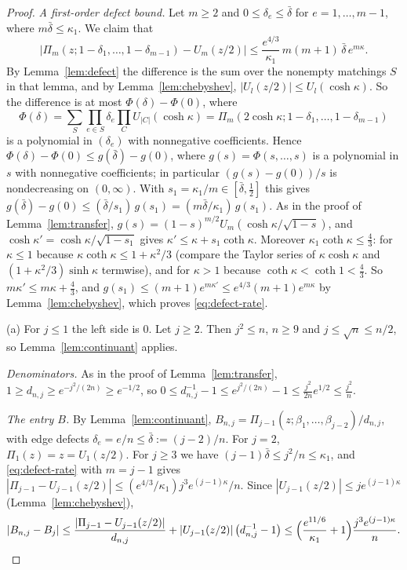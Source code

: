 \documentclass[11pt]{amsart}
\theoremstyle{definition}
\theoremstyle{remark}
\numberwithin{equation}{section}
\begin{document}
\begin{proof}
\emph{A first-order defect bound.} Let $m\ge2$ and $0\le\delta_e\le\bar\delta$ for $e=1,\dots,m-1$, where $m\bar\delta\le\kappa_1$. We claim that
\begin{equation}\label{eq:defect-rate}
\bigl|\Pi_m(z;1-\delta_1,\dots,1-\delta_{m-1})-U_m(z/2)\bigr|\le\frac{e^{4/3}}{\kappa_1}\,m(m+1)\,\bar\delta\,e^{m\kappa}.
\end{equation}
By Lemma~\ref{lem:defect} the difference is the sum over the nonempty matchings $S$ in that lemma, and by Lemma~\ref{lem:chebyshev}, $|U_l(z/2)|\le U_l(\cosh\kappa)$. So the difference is at most $\Phi(\delta)-\Phi(0)$, where
\[
\Phi(\delta)=\sum_S\prod_{e\in S}\delta_e\prod_CU_{|C|}(\cosh\kappa)=\Pi_m(2\cosh\kappa;1-\delta_1,\dots,1-\delta_{m-1})
\]
is a polynomial in $(\delta_e)$ with nonnegative coefficients. Hence $\Phi(\delta)-\Phi(0)\le g(\bar\delta)-g(0)$, where $g(s)=\Phi(s,\dots,s)$ is a polynomial in $s$ with nonnegative coefficients; in particular $(g(s)-g(0))/s$ is nondecreasing on $(0,\infty)$. With $s_1=\kappa_1/m\in[\bar\delta,\frac12]$ this gives $g(\bar\delta)-g(0)\le(\bar\delta/s_1)\,g(s_1)=(m\bar\delta/\kappa_1)\,g(s_1)$. As in the proof of Lemma~\ref{lem:transfer}, $g(s)=(1-s)^{m/2}U_m(\cosh\kappa/\sqrt{1-s})$, and $\cosh\kappa'=\cosh\kappa/\sqrt{1-s_1}$ gives $\kappa'\le\kappa+s_1\coth\kappa$. Moreover $\kappa_1\coth\kappa\le\frac43$: for $\kappa\le1$ because $\kappa\coth\kappa\le1+\kappa^2/3$ (compare the Taylor series of $\kappa\cosh\kappa$ and $(1+\kappa^2/3)\sinh\kappa$ termwise), and for $\kappa>1$ because $\coth\kappa<\coth1<\frac43$. So $m\kappa'\le m\kappa+\frac43$, and $g(s_1)\le(m+1)e^{m\kappa'}\le e^{4/3}(m+1)e^{m\kappa}$ by Lemma~\ref{lem:chebyshev}, which proves \eqref{eq:defect-rate}.

(a) For $j\le1$ the left side is $0$. Let $j\ge2$. Then $j^2\le n$, $n\ge9$ and $j\le\sqrt n\le n/2$, so Lemma~\ref{lem:continuant} applies.

\emph{Denominators.} As in the proof of Lemma~\ref{lem:transfer}, $1\ge d_{n,j}\ge e^{-j^2/(2n)}\ge e^{-1/2}$, so $0\le d_{n,j}^{-1}-1\le e^{j^2/(2n)}-1\le\frac{j^2}{2n}e^{1/2}\le\frac{j^2}n$.

\emph{The entry $B$.} By Lemma~\ref{lem:continuant}, $B_{n,j}=\Pi_{j-1}(z;\beta_1,\dots,\beta_{j-2})/d_{n,j}$, with edge defects $\delta_e=e/n\le\bar\delta:=(j-2)/n$. For $j=2$, $\Pi_1(z)=z=U_1(z/2)$. For $j\ge3$ we have $(j-1)\bar\delta\le j^2/n\le\kappa_1$, and \eqref{eq:defect-rate} with $m=j-1$ gives $|\Pi_{j-1}-U_{j-1}(z/2)|\le(e^{4/3}/\kappa_1)j^3e^{(j-1)\kappa}/n$. Since $|U_{j-1}(z/2)|\le je^{(j-1)\kappa}$ (Lemma~\ref{lem:chebyshev}),
\[
|B_{n,j}-B_j|\le\frac{|\Pi_{j-1}-U_{j-1}(z/2)|}{d_{n,j}}+|U_{j-1}(z/2)|\,\bigl(d_{n,j}^{-1}-1\bigr)\le\Bigl(\frac{e^{11/6}}{\kappa_1}+1\Bigr)\frac{j^3e^{(j-1)\kappa}}n .
\]


\end{proof}
\end{document}
